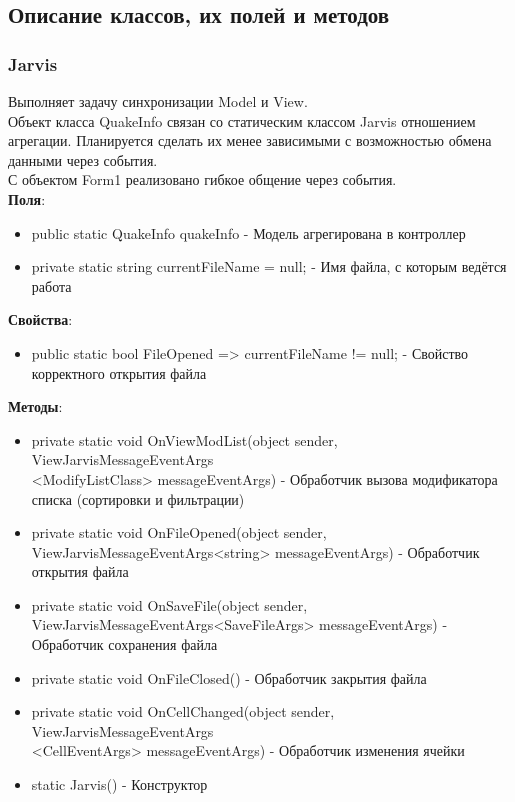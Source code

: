 \documentclass[a4paper,12pt, fleqn]{article}
\theoremstyle{plain} %
\theoremstyle{definition} %
\theoremstyle{remark} %
\numberwithin{equation}{section}
\begin{document}
\subsection{Описание классов, их полей и методов}

\subsubsection{Jarvis}
Выполняет задачу синхронизации Model и View.\\
Объект класса QuakeInfo связан со статическим классом Jarvis отношением агрегации. Планируется сделать их менее зависимыми с возможностью обмена данными через события.\\
С объектом Form1 реализовано гибкое общение через события.\\[2em]
\textbf{Поля}:
\begin{itemize}
	\item public static QuakeInfo quakeInfo - Модель агрегирована в контроллер
	\item private static string currentFileName = null; - Имя файла, с которым ведётся работа
\end{itemize}


\textbf{Свойства}:

\begin{itemize}
	\item public static bool FileOpened => currentFileName != null; - Свойство корректного открытия файла
\end{itemize}

\textbf{Методы}:
\begin{itemize}
	\item private static void OnViewModList(object sender, ViewJarvisMessageEventArgs\\<ModifyListClass> messageEventArgs) - Обработчик вызова модификатора списка (сортировки и фильтрации)
	\item private static void OnFileOpened(object sender, ViewJarvisMessageEventArgs<string> messageEventArgs) - Обработчик открытия файла
	\item private static void OnSaveFile(object sender, ViewJarvisMessageEventArgs<SaveFileArgs> messageEventArgs) - Обработчик сохранения файла
	\item private static void OnFileClosed() - Обработчик закрытия файла
	\item private static void OnCellChanged(object sender, ViewJarvisMessageEventArgs\\<CellEventArgs> messageEventArgs) - Обработчик изменения ячейки
	\item static Jarvis() - Конструктор
\end{itemize}
\end{document}

